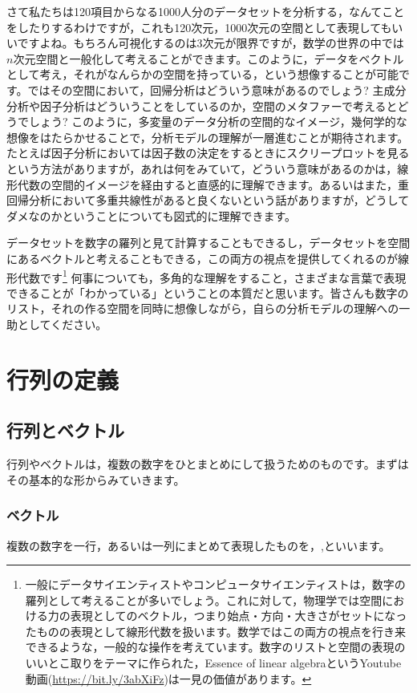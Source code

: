 \documentclass{ltjsbook}
\begin{document}
さて私たちは120項目からなる1000人分のデータセットを分析する，なんてことをしたりするわけですが，これも120次元，1000次元の空間として表現してもいいですよね。もちろん可視化するのは3次元が限界ですが，数学の世界の中では$n$次元空間と一般化して考えることができます。このように，データをベクトルとして考え，それがなんらかの空間を持っている，という想像することが可能です。ではその空間において，回帰分析はどういう意味があるのでしょう? 主成分分析や因子分析はどういうことをしているのか，空間のメタファーで考えるとどうでしょう? このように，多変量のデータ分析の空間的なイメージ，幾何学的な想像をはたらかせることで，分析モデルの理解が一層進むことが期待されます。たとえば因子分析においては因子数の決定をするときにスクリープロットを見るという方法がありますが，あれは何をみていて，どういう意味があるのかは，線形代数の空間的イメージを経由すると直感的に理解できます。あるいはまた，重回帰分析において多重共線性があると良くないという話がありますが，どうしてダメなのかということについても図式的に理解できます。

データセットを数字の羅列と見て計算することもできるし，データセットを空間にあるベクトルと考えることもできる，この両方の視点を提供してくれるのが線形代数です\footnote{一般にデータサイエンティストやコンピュータサイエンティストは，数字の羅列として考えることが多いでしょう。これに対して，物理学では空間における力の表現としてのベクトル，つまり始点・方向・大きさがセットになったものの表現として線形代数を扱います。数学ではこの両方の視点を行き来できるような，一般的な操作を考えています。数字のリストと空間の表現のいいとこ取りをテーマに作られた，Essence of linear algebraというYoutube動画(\url{https://bit.ly/3abXiFz})は一見の価値があります。}
何事についても，多角的な理解をすること，さまざまな言葉で表現できることが「わかっている」ということの本質だと思います。皆さんも数字のリスト，それの作る空間を同時に想像しながら，自らの分析モデルの理解への一助としてください。

\section{行列の定義}
\subsection{行列とベクトル}
行列やベクトルは，複数の数字をひとまとめにして扱うためのものです。まずはその基本的な形からみていきます。

\subsubsection{ベクトル}
複数の数字を一行，あるいは一列にまとめて表現したものを，,といいます。
\end{document}
